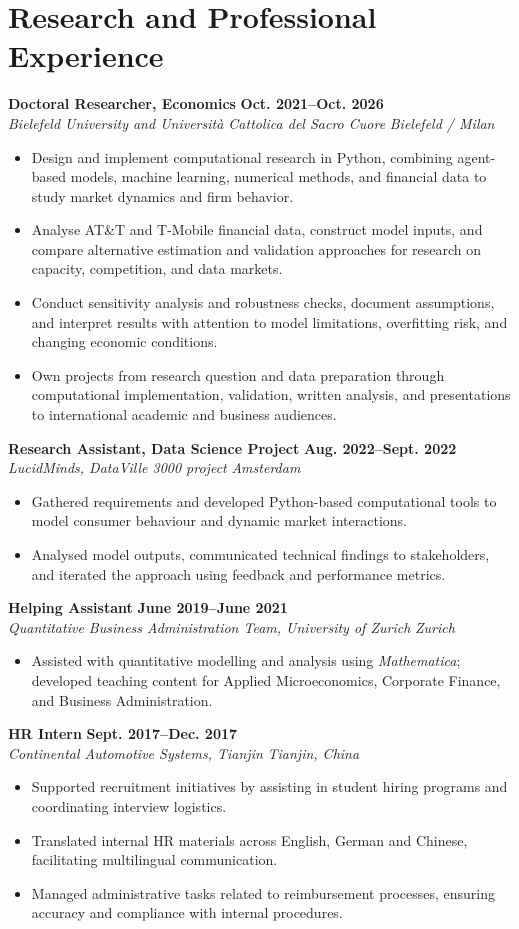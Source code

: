 \documentclass[a4paper,11pt]{article}
\newcommand{\role}[4]{%
  \textbf{#1} \hfill \textbf{#2}\\
  \textit{#3} \hfill \textit{#4}\par
}
\begin{document}
\section{Research and Professional Experience}
\role{Doctoral Researcher, Economics}{Oct. 2021--Oct. 2026}{Bielefeld University and Universit\`a Cattolica del Sacro Cuore}{Bielefeld / Milan}
\begin{itemize}
  \item Design and implement computational research in Python, combining agent-based models, machine learning, numerical methods, and financial data to study market dynamics and firm behavior.
  \item Analyse AT\&T and T-Mobile financial data, construct model inputs, and compare alternative estimation and validation approaches for research on capacity, competition, and data markets.
  \item Conduct sensitivity analysis and robustness checks, document assumptions, and interpret results with attention to model limitations, overfitting risk, and changing economic conditions.
  \item Own projects from research question and data preparation through computational implementation, validation, written analysis, and presentations to international academic and business audiences.
\end{itemize}

\role{Research Assistant, Data Science Project}{Aug. 2022--Sept. 2022}{LucidMinds, DataVille 3000 project}{Amsterdam}
\begin{itemize}
  \item Gathered requirements and developed Python-based computational tools to model consumer behaviour and dynamic market interactions.
  \item Analysed model outputs, communicated technical findings to stakeholders, and iterated the approach using feedback and performance metrics.
\end{itemize}

\role{Helping Assistant}{June 2019--June 2021}{Quantitative Business Administration Team, University of Zurich}{Zurich}
\begin{itemize}
  \item Assisted with quantitative modelling and analysis using \textit{Mathematica}; developed teaching content for Applied Microeconomics, Corporate Finance, and Business Administration.
\end{itemize}

\role{HR Intern}{Sept. 2017--Dec. 2017}{Continental Automotive Systems, Tianjin}{Tianjin, China}
\begin{itemize}
  \item Supported recruitment initiatives by assisting in student hiring programs and coordinating interview logistics.
  \item Translated internal HR materials across English, German and Chinese, facilitating multilingual communication.
  \item Managed administrative tasks related to reimbursement processes, ensuring accuracy and compliance with internal procedures.
\end{itemize}
\end{document}
